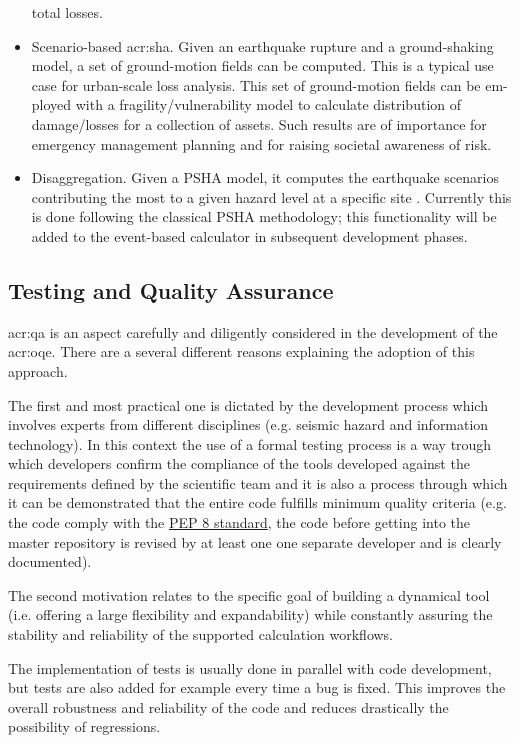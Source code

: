 \begin{itemize}
    total losses.
\item Scenario-based \gls{acr:sha}. Given an earthquake rupture and a 
    ground-shaking model, a set of ground-motion fields can be computed. 
    This is a typical use case for urban-scale loss analysis. This set of
    ground-motion fields can be em- ployed with a fragility/vulnerability 
    model to calculate distribution of damage/losses for a collection of
    assets. Such results are of importance for emergency management planning
    and for raising societal awareness of risk.
\item Disaggregation. Given a PSHA model, it computes the earthquake
    scenarios contributing the most to a given hazard level at a specific
    site \parencite{bazzurro1999}. Currently this is done following 
    the classical PSHA methodology; this functionality will be added to 
    the event-based calculator in subsequent development phases.
\end{itemize}
%
\subsection{Testing and Quality Assurance}
%
\gls{acr:qa} is an aspect carefully and diligently considered 
in the development of the \gls{acr:oqe}. There are a several 
different reasons explaining the adoption of this approach.

The first and most practical one is dictated by the development 
process which involves experts from different disciplines (e.g. 
seismic hazard and information technology). 
%
In this context the use of a formal testing process is a way 
trough which developers confirm the compliance of the tools 
developed against the requirements defined by the scientific 
team and it is also a process through which it can be 
demonstrated that the entire code fulfills minimum quality 
criteria (e.g. the code comply with the
\href{http://legacy.python.org/dev/peps/pep-0008/}{PEP 8 standard}, 
the code before getting into the master repository is 
revised by at least one one separate developer and is 
clearly documented).
 
The second motivation relates to the specific goal of building 
a dynamical tool (i.e. offering a large flexibility and expandability) 
while constantly assuring the stability and reliability of 
the supported calculation workflows.

The implementation of tests is usually done in parallel with code 
development, but tests are also added for example every time a bug 
is fixed.
%
This improves the overall robustness and reliability of the code
and reduces drastically the possibility of regressions.

